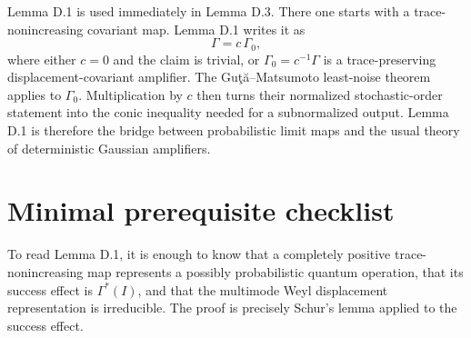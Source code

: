 \documentclass[11pt]{article}
\begin{document}
Lemma D.1 is used immediately in Lemma D.3.  There one starts with a
trace-nonincreasing covariant map.  Lemma D.1 writes it as
\[
  \Gamma=c\,\Gamma_0,
\]
where either $c=0$ and the claim is trivial, or $\Gamma_0=c^{-1}\Gamma$ is a
trace-preserving displacement-covariant amplifier.  The Gu\c{t}\u{a}--Matsumoto
least-noise theorem applies to $\Gamma_0$.  Multiplication by $c$ then turns
their normalized stochastic-order statement into the conic inequality needed
for a subnormalized output.  Lemma D.1 is therefore the bridge between
probabilistic limit maps and the usual theory of deterministic Gaussian
amplifiers.

\section{Minimal prerequisite checklist}

To read Lemma D.1, it is enough to know that a completely positive
trace-nonincreasing map represents a possibly probabilistic quantum
operation, that its success effect is $\Gamma^*(I)$, and that the multimode
Weyl displacement representation is irreducible.  The proof is precisely
Schur's lemma applied to the success effect.
\end{document}
